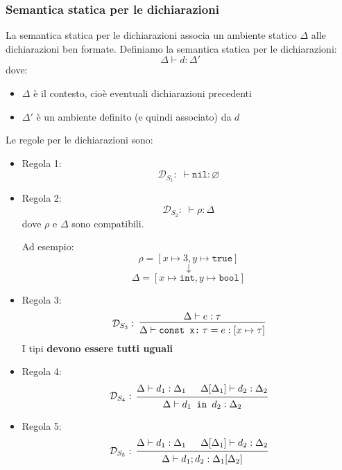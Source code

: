 \documentclass[a4paper]{article}
\begin{document}
\subsubsection{Semantica statica per le dichiarazioni}
La semantica statica per le dichiarazioni associa un ambiente statico \( \Delta \) 
alle dichiarazioni ben formate.
Definiamo la semantica statica per le dichiarazioni:
\[
  \Delta \vdash d: \Delta'
\] 
dove:
\begin{itemize}
  \item \( \Delta \) è il contesto, cioè eventuali dichiarazioni precedenti
  \item \( \Delta' \) è un ambiente definito (e quindi associato) da \( d \)
\end{itemize}
Le regole per le dichiarazioni sono:
\begin{itemize}
  \item Regola 1:
    \[
      \mathcal{D}_{S_1}: \; \vdash \texttt{nil} : \varnothing
    \] 

  \item Regola 2:
    \[
      \mathcal{D}_{S_2}: \; \vdash \rho : \Delta
    \]
    dove \( \rho  \) e \( \Delta \) sono compatibili.
    \begin{example}
      Ad esempio:
      \[
        \rho = \left[ x \mapsto 3, y \mapsto \texttt{true} \right]
      \] 
      \[
        \downarrow
      \] 
      \[
        \Delta = \left[ x \mapsto \texttt{int}, y \mapsto \texttt{bool} \right]
      \] 
    \end{example}

  \item Regola 3:
    \[
      \mathcal{D}_{S_3}: \;
      \begin{prooftree}
        \hypo{\Delta \vdash e : \tau}
        \infer1{\Delta \vdash \texttt{const x:}\; \tau = e : \left[ x \mapsto \tau \right]}
      \end{prooftree}
    \] 
    I tipi \textbf{devono essere tutti uguali}

  \item Regola 4:
    \[
      \mathcal{D}_{S_4}: \;
      \begin{prooftree}
        \hypo{\Delta \vdash d_1 : \Delta_1}
        \hypo{\Delta[\Delta_1] \vdash d_2 : \Delta_2}
        \infer2{\Delta \vdash d_1 \texttt{ in } d_2 : \Delta_2}
      \end{prooftree}
    \] 

  \item Regola 5:
    \[
      \mathcal{D}_{S_5}: \;
      \begin{prooftree}
        \hypo{\Delta \vdash d_1 : \Delta_1}
        \hypo{\Delta[\Delta_1] \vdash d_2 : \Delta_2}
        \infer2{\Delta \vdash d_1; d_2 : \Delta_1[\Delta_2]}
      \end{prooftree}
    \]
\end{itemize}
\end{document}
